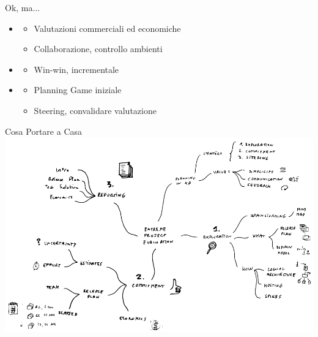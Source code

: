 	\begin{frame}{Ok, ma...}
		\begin{itemize}
			\item {}
				\begin{itemize}
					\item Valutazioni commerciali ed economiche
					\item Collaborazione, controllo ambienti
				\end{itemize}
			\item {}
				\begin{itemize}
					\item Win-win, incrementale
				\end{itemize}
			\item {}
				\begin{itemize}
					\item Planning Game iniziale
					\item Steering, convalidare valutazione
				\end{itemize}
		\end{itemize}
		
	\end{frame}

	\begin{frame}{Cosa Portare a Casa}
		\hspace*{-0.5cm} \includegraphics[scale=0.26]{images/takeaway}
	\end{frame}
	
